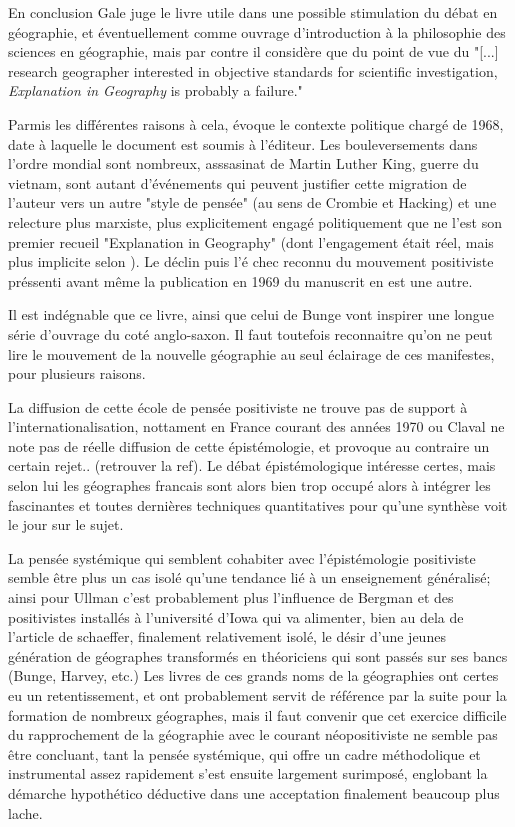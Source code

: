 {En conclusion Gale juge le livre utile dans une possible stimulation du débat en géographie, et éventuellement comme ouvrage d'introduction à la philosophie des sciences en géographie, mais par contre il considère que du point de vue du "[...] research geographer interested in objective standards for scientific investigation, \textit{Explanation in Geography} is probably a failure." \autocite[316]{Gale1972}

Parmis les différentes raisons à cela, \autocite{Barnes2006} évoque le contexte politique chargé de 1968, date à laquelle le document est soumis à l'éditeur. Les bouleversements dans l'ordre mondial sont nombreux, asssasinat de Martin Luther King, guerre du vietnam, sont autant d'événements qui peuvent justifier cette migration de l'auteur vers un autre "style de pensée" (au sens de Crombie et Hacking) \autocite{Barnes2006} et une relecture plus marxiste, plus explicitement engagé politiquement que ne l'est son premier recueil "Explanation in Geography" (dont l'engagement était réel, mais plus implicite selon \autocite{Johnston2008}). Le déclin puis l'é                                                                       chec reconnu du mouvement positiviste préssenti avant même la publication en 1969 du manuscrit en est une autre. \autocite[47]{Barnes2006}

Il est indégnable que ce livre, ainsi que celui de Bunge vont inspirer une longue série d'ouvrage du coté anglo-saxon. Il faut toutefois reconnaitre qu'on ne peut lire le mouvement de la nouvelle géographie au seul éclairage de ces manifestes, pour plusieurs raisons. 

La diffusion de cette école de pensée positiviste ne trouve pas de support à l'internationalisation, nottament en France courant des années 1970 ou Claval ne note pas de réelle diffusion de cette épistémologie, et provoque au contraire un certain rejet.. (retrouver la ref). Le débat épistémologique intéresse certes, mais selon lui les géographes francais sont alors bien trop occupé alors à intégrer les fascinantes et toutes dernières techniques quantitatives pour qu'une synthèse voit le jour sur le sujet.\autocite[27-29]{Claval2003} %

La pensée systémique qui semblent cohabiter avec l'épistémologie positiviste semble être plus un cas isolé qu'une tendance lié à un enseignement généralisé; ainsi pour Ullman c'est probablement plus l'influence de Bergman et des positivistes installés à l'université d'Iowa qui va alimenter, bien au dela de l'article de schaeffer, finalement relativement isolé, le désir d'une jeunes génération de géographes transformés en théoriciens qui sont passés sur ses bancs (Bunge, Harvey, etc.) \autocite{Ullman (a verifier)} Les livres de ces grands noms de la géographies ont certes eu un retentissement, et ont probablement servit de référence par la suite pour la formation de nombreux géographes, mais il faut convenir que cet exercice difficile du rapprochement de la géographie avec le courant néopositiviste ne semble pas être concluant, tant la pensée systémique, qui offre un cadre méthodolique et instrumental assez rapidement s'est ensuite largement surimposé, englobant la démarche hypothético déductive dans une acceptation finalement beaucoup plus lache.

}
